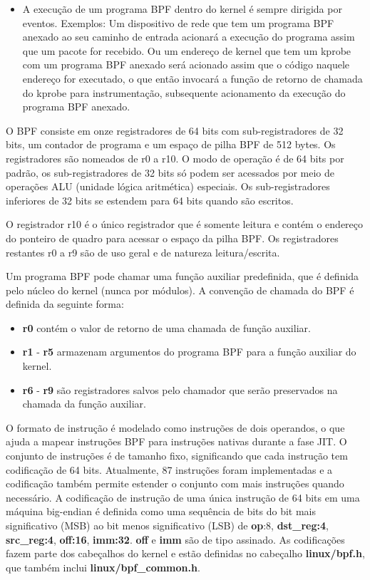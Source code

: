 \documentclass[sigconf]{acmart}
\begin{document}
\begin{itemize}
\item A execução de um programa BPF dentro do kernel é sempre dirigida por eventos. Exemplos: Um dispositivo de rede que tem um programa BPF anexado ao seu caminho de entrada acionará a execução do programa assim que um pacote for recebido. Ou um endereço de kernel que tem um kprobe com um programa BPF anexado será acionado assim que o código naquele endereço for executado, o que então invocará a função de retorno de chamada do kprobe para instrumentação, subsequente acionamento da execução do programa BPF anexado.
\end{itemize}

O BPF consiste em onze registradores de 64 bits com sub-registradores de 32 bits, um contador de programa e um espaço de pilha BPF de 512 bytes. Os registradores são nomeados de r0 a r10. O modo de operação é de 64 bits por padrão, os sub-registradores de 32 bits só podem ser acessados por meio de operações ALU (unidade lógica aritmética) especiais. Os sub-registradores inferiores de 32 bits se estendem para 64 bits quando são escritos.

O registrador r10 é o único registrador que é somente leitura e contém o endereço do ponteiro de quadro para acessar o espaço da pilha BPF. Os registradores restantes r0 a r9 são de uso geral e de natureza leitura/escrita.

Um programa BPF pode chamar uma função auxiliar predefinida, que é definida pelo núcleo do kernel (nunca por módulos). A convenção de chamada do BPF é definida da seguinte forma:
\begin{itemize}
\item \textbf{r0} contém o valor de retorno de uma chamada de função auxiliar.
\item \textbf{r1} - \textbf{r5} armazenam argumentos do programa BPF para a função auxiliar do kernel.
\item \textbf{r6} - \textbf{r9} são registradores salvos pelo chamador que serão preservados na chamada da função auxiliar.
\end{itemize}

O formato de instrução é modelado como instruções de dois operandos, o que ajuda a mapear instruções BPF para instruções nativas durante a fase JIT. O conjunto de instruções é de tamanho fixo, significando que cada instrução tem codificação de 64 bits. Atualmente, 87 instruções foram implementadas e a codificação também permite estender o conjunto com mais instruções quando necessário. A codificação de instrução de uma única instrução de 64 bits em uma máquina big-endian é definida como uma sequência de bits do bit mais significativo (MSB) ao bit menos significativo (LSB) de \textbf{op}:8, \textbf{dst\_reg:4}, \textbf{src\_reg:4}, \textbf{off:16}, \textbf{imm:32}. \textbf{off} e \textbf{imm} são de tipo assinado. As codificações fazem parte dos cabeçalhos do kernel e estão definidas no cabeçalho \textbf{linux/bpf.h}, que também inclui \textbf{linux/bpf\_common.h}.
\end{document}

